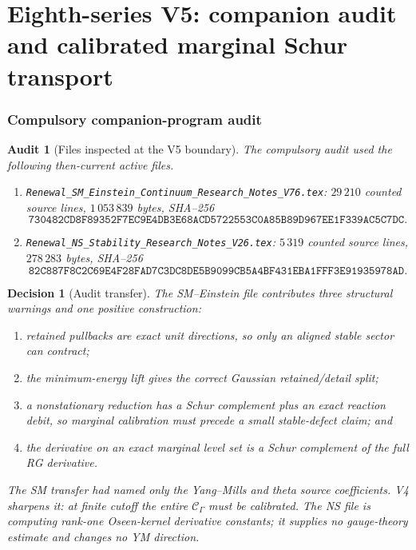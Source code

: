 \documentclass[11pt,oneside]{book}
\newtheorem{audit}[theorem]{Audit}
\newtheorem{decision}[theorem]{Decision}
\theoremstyle{definition}
\theoremstyle{remark}
\begin{document}

\part{Eighth-series V5: companion audit and calibrated marginal
Schur transport}
\label{part:e8v5}

\section{Compulsory companion-program audit}
\label{sec:e8v5-audit}

\begin{audit}[Files inspected at the V5 boundary]
\label{aud:e8v5-files}
The compulsory audit used the following then-current active files.
\begin{enumerate}[label=\textup{(\roman*)},leftmargin=3.5em]
\item
\texttt{Renewal\_SM\_Einstein\_Continuum\_Research\_Notes\_V76.tex}:
\(29\,210\) counted source lines, \(1\,053\,839\) bytes, SHA--256
\[
\texttt{730482CD8F89352F7EC9E4DB3E68ACD5722553C0A85B89D967EE1F339AC5C7DC}.
\]
\item
\texttt{Renewal\_NS\_Stability\_Research\_Notes\_V26.tex}:
\(5\,319\) counted source lines, \(278\,283\) bytes, SHA--256
\[
\texttt{82C887F8C2C69E4F28FAD7C3DC8DE5B9099CB5A4BF431EBA1FFF3E91935978AD}.
\]
\end{enumerate}
\end{audit}

\begin{decision}[Audit transfer]
\label{dec:e8v5-transfer}
The SM--Einstein file contributes three structural warnings and one
positive construction:
\begin{enumerate}[label=\textup{(\alph*)},leftmargin=3.5em]
\item retained pullbacks are exact unit directions, so only an aligned
      stable sector can contract;
\item the minimum-energy lift gives the correct Gaussian
      retained/detail split;
\item a nonstationary reduction has a Schur complement plus an exact
      reaction debit, so marginal calibration must precede a small
      stable-defect claim; and
\item the derivative on an exact marginal level set is a Schur
      complement of the full RG derivative.
\end{enumerate}
The SM transfer had named only the Yang--Mills and theta source
coefficients.  V4 sharpens it: at finite cutoff the entire
\({\mathcal C}_\Gamma\) must be calibrated.  The NS file is computing
rank-one Oseen-kernel derivative constants; it supplies no
gauge-theory estimate and changes no YM direction.
\end{decision}
\end{document}
